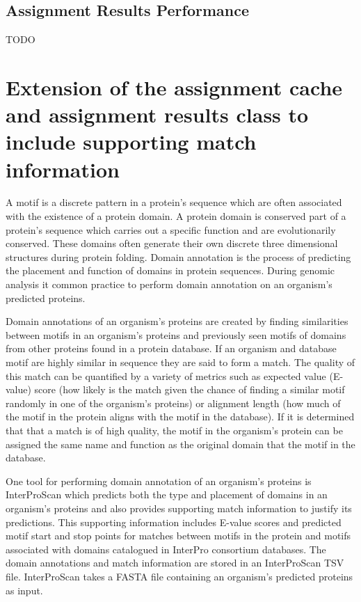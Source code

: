 \subsection{Assignment Results Performance}

TODO

\section{Extension of the assignment cache and assignment results class to include supporting match information}

A motif is a discrete pattern in a protein's sequence which are often associated with the existence of a protein domain. A protein domain is conserved part of a protein's sequence which carries out a specific function and are evolutionarily conserved. These domains often generate their own discrete three dimensional structures during protein folding. Domain annotation is the process of predicting the placement and function of domains in protein sequences. During genomic analysis it common practice to perform domain annotation on an organism's predicted proteins.

Domain annotations of an organism's proteins are created by finding similarities between motifs in an organism's proteins and previously seen motifs of domains from other proteins found in a protein database. If an organism and database motif are highly similar in sequence they are said to form a match. The quality of this match can be quantified by a variety of metrics such as expected value (E-value) score (how likely is the match given the chance of finding a similar motif randomly in one of the organism's proteins) or alignment length (how much of the motif in the protein aligns with the motif in the database). If it is determined that that a match is of high quality, the motif in the organism's protein can be assigned the same name and function as the original domain that the motif in the database.

One tool for performing domain annotation of an organism's proteins is InterProScan which predicts both the type and placement of domains in an organism's proteins and also provides supporting match information to justify its predictions. This supporting information includes E-value scores and predicted motif start and stop points for matches between motifs in the protein and motifs associated with domains catalogued in InterPro consortium databases. The domain annotations and match information are stored in an InterProScan TSV file. InterProScan takes a FASTA file containing an organism's predicted proteins as input.

